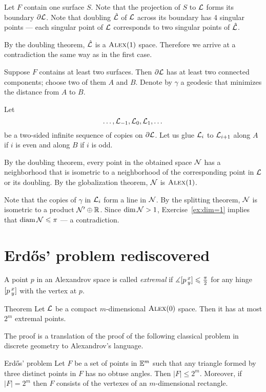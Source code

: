 Let $F$ contain one surface $S$.
Note that the projection of $S$ to $\mathcal{L}$ forms its boundary $\partial \mathcal{L}$.
Note that doubling $\hat {\mathcal{L}}$ of $\mathcal{L}$ across its boundary has 4 singular points --- each singular point of $\mathcal{L}$ corresponds to two singular points of $\hat {\mathcal{L}}$.

By the doubling theorem, $\hat {\mathcal{L}}$ is a $\textsc{Alex}(1)$ space.
Therefore we arrive at a contradiction the same way as in the first case.

Suppose $F$ contains at least two surfaces.
Then $\partial\mathcal{L}$ has at least two connected components; choose two of them $A$ and $B$.
Denote by $\gamma$ a geodesic that minimizes the distance from $A$ to $B$.

Let 
\[\dots,\mathcal{L}_{-1},\mathcal{L}_{0},\mathcal{L}_{1},\dots\]
be a two-sided infinite sequence of copies on $\partial\mathcal{L}$.
Let us glue $\mathcal{L}_{i}$ to $\mathcal{L}_{i+1}$ along $A$ if $i$ is even and along $B$ if $i$ is odd.

By the doubling theorem, every point in the obtained space $\mathcal{N}$ has a neighborhood that is isometric to a neighborhood of the corresponding point in $\mathcal{L}$ or its doubling.
By the globalization theorem, $\mathcal{N}$ is $\textsc{Alex}(1)$.

Note that the copies of $\gamma$ in $\mathcal{L}_{i}$ form a line in $\mathcal{N}$.
By the splitting theorem, $\mathcal{N}$ is isometric to a product $\mathcal{N}'\oplus \mathbb{R}$.
Since $\operatorname{\rm dim}\nolimits\mathcal{N}>1$, Exercise~\ref{ex:dim=1} implies that $\operatorname{\rm diam}\nolimits\mathcal{N}\leqslant \pi$ --- a contradiction.
\qeds

\section{Erd\H{o}s' problem rediscovered}

A point $p$ in an Alexandrov space is called \emph{extremal} if $\measuredangle[p\,{}^{x}_{y}]\leqslant \tfrac\pi2$ for any hinge $[p\,{}^{x}_{y}]$ with the vertex at $p$. 

\begin{thm}{Theorem}\label{thm:extr-point}
Let $\mathcal{L}$ be a compact $m$-dimensional $\textsc{Alex}(0)$ space.
Then it has at most $2^m$ extremal points.
\end{thm}

The proof is a translation of the proof of the following classical problem in discrete geometry to Alexandrov's language.

\begin{thm}{Erd\H{o}s' problem}
Let $F$ be a set of points in $\mathbb{E}^m$ such that any triangle formed by three distinct points in $F$ has no obtuse angles.
Then  $|F|\le2^m$.
Moreover, if $|F|=2^m$ then $F$ consists of the vertexes of an $m$-dimensional rectangle.
\end{thm}

